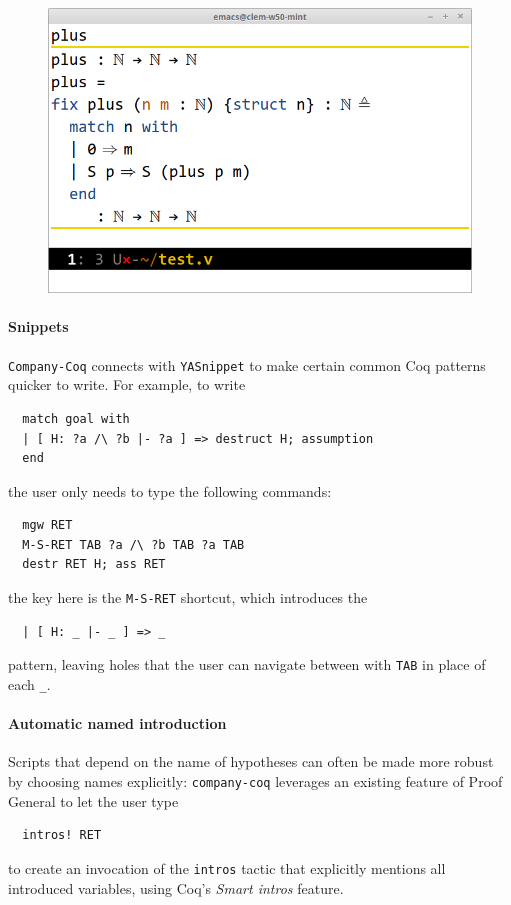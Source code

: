 \documentclass[preprint]{sigplanconf}
\newcommand{\proofg}{Proof General\xspace}
\begin{document}
\begin{figure}[H]
  \centering
  \includegraphics[width=\linewidth]{inline-docs-xxl.png}
\end{figure}

\paragraph{Snippets} \texttt{Company-Coq} connects with \texttt{YASnippet} to make certain common Coq patterns quicker to write. For example, to write
\begin{verbatim}
  match goal with
  | [ H: ?a /\ ?b |- ?a ] => destruct H; assumption
  end
\end{verbatim}
the user only needs to type the following commands:
\begin{verbatim}
  mgw RET
  M-S-RET TAB ?a /\ ?b TAB ?a TAB
  destr RET H; ass RET
\end{verbatim}
the key here is the \texttt{M-S-RET} shortcut, which introduces the
\begin{verbatim}
  | [ H: _ |- _ ] => _
\end{verbatim}
pattern, leaving holes that the user can navigate between with \texttt{TAB} in place of each \texttt{\_}.

\paragraph{Automatic named introduction} Scripts that depend on the name of hypotheses can often be made more robust by choosing names explicitly: \texttt{company-coq} leverages an existing feature of \proofg to let the user type
\begin{verbatim}
  intros! RET
\end{verbatim}
to create an invocation of the \texttt{intros} tactic that explicitly mentions all introduced variables, using Coq's \emph{Smart intros} feature.
\end{document}
